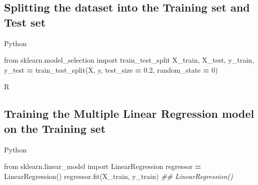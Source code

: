 \documentclass[
]{book}
\newenvironment{Shaded}{\begin{snugshade}}{\end{snugshade}}
\newcommand{\AttributeTok}[1]{\textcolor[rgb]{0.77,0.63,0.00}{#1}}
\newcommand{\CommentTok}[1]{\textcolor[rgb]{0.56,0.35,0.01}{\textit{#1}}}
\newcommand{\ConstantTok}[1]{\textcolor[rgb]{0.00,0.00,0.00}{#1}}
\newcommand{\DecValTok}[1]{\textcolor[rgb]{0.00,0.00,0.81}{#1}}
\newcommand{\FloatTok}[1]{\textcolor[rgb]{0.00,0.00,0.81}{#1}}
\newcommand{\FunctionTok}[1]{\textcolor[rgb]{0.00,0.00,0.00}{#1}}
\newcommand{\ImportTok}[1]{#1}
\newcommand{\NormalTok}[1]{#1}
\newcommand{\OperatorTok}[1]{\textcolor[rgb]{0.81,0.36,0.00}{\textbf{#1}}}
\newcommand{\OtherTok}[1]{\textcolor[rgb]{0.56,0.35,0.01}{#1}}
\newcommand{\SpecialCharTok}[1]{\textcolor[rgb]{0.00,0.00,0.00}{#1}}
\theoremstyle{definition}
\theoremstyle{definition}
\theoremstyle{definition}
\theoremstyle{definition}
\theoremstyle{remark}
\begin{document}
\hypertarget{splitting-the-dataset-into-the-training-set-and-test-set-2}{%
\subsection{Splitting the dataset into the Training set and Test set}\label{splitting-the-dataset-into-the-training-set-and-test-set-2}}

Python

\begin{Shaded}
\begin{Highlighting}[]
\ImportTok{from}\NormalTok{ sklearn.model\_selection }\ImportTok{import}\NormalTok{ train\_test\_split}
\NormalTok{X\_train, X\_test, y\_train, y\_test }\OperatorTok{=}\NormalTok{ train\_test\_split(X, y, test\_size }\OperatorTok{=} \FloatTok{0.2}\NormalTok{, random\_state }\OperatorTok{=} \DecValTok{0}\NormalTok{)}
\end{Highlighting}
\end{Shaded}

R

\begin{Shaded}
\end{Shaded}

\hypertarget{training-the-multiple-linear-regression-model-on-the-training-set}{%
\subsection{Training the Multiple Linear Regression model on the Training set}\label{training-the-multiple-linear-regression-model-on-the-training-set}}

Python

\begin{Shaded}
\begin{Highlighting}[]
\ImportTok{from}\NormalTok{ sklearn.linear\_model }\ImportTok{import}\NormalTok{ LinearRegression}
\NormalTok{regressor }\OperatorTok{=}\NormalTok{ LinearRegression()}
\NormalTok{regressor.fit(X\_train, y\_train)}
\CommentTok{\#\# LinearRegression()}
\end{Highlighting}
\end{Shaded}
\end{document}
